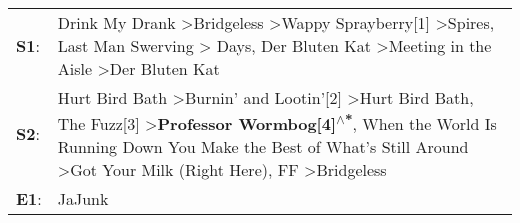 \begin{supertabular}{p{0.03\textwidth}p{0.92\textwidth}}
 \textbf{S1}:  &                                                                             Drink My Drank\textsuperscript{} \textgreater \enspace Bridgeless\textsuperscript{} \textgreater \enspace Wappy Sprayberry[1]\textsuperscript{} \textgreater \enspace Spires\textsuperscript{}, \enspace Last Man Swerving\textsuperscript{} \textgreater {} Days\textsuperscript{}, \enspace Der Bluten Kat\textsuperscript{} \textgreater \enspace Meeting in the Aisle\textsuperscript{} \textgreater \enspace Der Bluten Kat\textsuperscript{}  \enspace  \\
 \textbf{S2}:  &  Hurt Bird Bath\textsuperscript{} \textgreater \enspace Burnin' and Lootin'[2]\textsuperscript{} \textgreater \enspace Hurt Bird Bath\textsuperscript{}, \enspace The Fuzz[3]\textsuperscript{} \textgreater \enspace \textbf{Professor Wormbog[4]\textsuperscript{$\wedge$*}}, \enspace When the World Is Running Down You Make the Best of What's Still Around\textsuperscript{} \textgreater \enspace Got Your Milk (Right Here)\textsuperscript{}, \enspace FF\textsuperscript{} \textgreater \enspace Bridgeless\textsuperscript{}  \enspace  \\
 \textbf{E1}:  &                                                                                                                                                                                                                                                                                                                                                                                                                                                                                                                JaJunk\textsuperscript{}  \enspace  \\
\end{supertabular}

